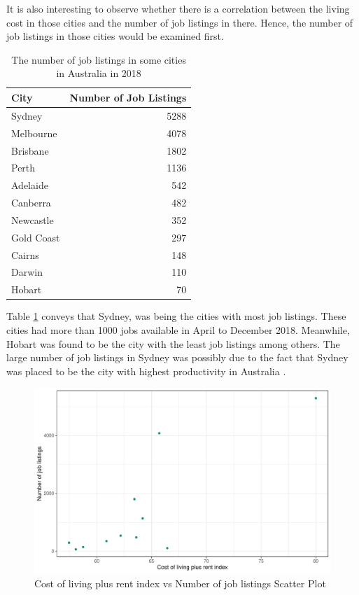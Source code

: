 \documentclass[11pt,a4paper,]{article}
\begin{document}
It is also interesting to observe whether there is a correlation between the living cost in those cities and the number of job listings in there. Hence, the number of job listings in those cities would be examined first.

\begin{table}

\caption{\label{tab:jobcity}The number of job listings in some cities in Australia in 2018}
\centering
\begin{tabular}[t]{lr}
\toprule
City & Number of Job Listings\\
\midrule
Sydney & 5288\\
Melbourne & 4078\\
Brisbane & 1802\\
Perth & 1136\\
Adelaide & 542\\
\addlinespace
Canberra & 482\\
Newcastle & 352\\
Gold Coast & 297\\
Cairns & 148\\
Darwin & 110\\
\addlinespace
Hobart & 70\\
\bottomrule
\end{tabular}
\end{table}

Table \ref{tab:jobcity} conveys that Sydney, was being the cities with most job listings. These cities had more than 1000 jobs available in April to December 2018. Meanwhile, Hobart was found to be the city with the least job listings among others. The large number of job listings in Sydney was possibly due to the fact that Sydney was placed to be the city with highest productivity in Australia \autocite{pwcreport}.

\begin{figure}
\centering
\includegraphics{Team_JHDP_Assignment4_files/figure-latex/corrplot-1.pdf}
\caption{\label{fig:corrplot}Cost of living plus rent index vs Number of job listings Scatter Plot}
\end{figure}
\end{document}
